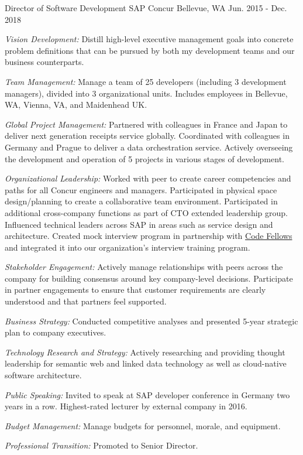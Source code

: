 \begin{cventries}

\cventry
{Director of Software Development} %
{SAP Concur} %
{Bellevue, WA} %
{Jun. 2015 - Dec. 2018} %
{ %
\begin{cvitems}
\item {\emph{Vision Development:} Distill high-level executive management goals into concrete problem definitions that can be pursued by both my development teams and our business counterparts.}
\item {\emph{Team Management:} Manage a team of 25 developers (including 3 development managers), divided into 3 organizational units. Includes employees in Bellevue, WA, Vienna, VA, and Maidenhead UK.}
\item {\emph{Global Project Management:} Partnered with colleagues in France and Japan to deliver next generation receipts service globally. Coordinated with colleagues in Germany and Prague to deliver a data orchestration service. Actively overseeing the development and operation of 5 projects in various stages of development.}
\item {\emph{Organizational Leadership:} Worked with peer to create career competencies and paths for all Concur engineers and managers. Participated in physical space design/planning to create a collaborative team environment. Participated in additional cross-company functions as part of CTO extended leadership group. Influenced technical leaders across SAP in areas such as service design and architecture. Created mock interview program in partnership with \href{https://www.codefellows.org/}{Code Fellows} and integrated it into our organization’s interview training program.}
\item {\emph{Stakeholder Engagement:} Actively manage relationships with peers across the company for building consensus around key company-level decisions. Participate in partner engagements to ensure that customer requirements are clearly understood and that partners feel supported.}
\item {\emph{Business Strategy:} Conducted competitive analyses and presented 5-year strategic plan to company executives.}
\item {\emph{Technology Research and Strategy:} Actively researching and providing thought leadership for semantic web and linked data technology as well as cloud-native software architecture. }
\item {\emph{Public Speaking:} Invited to speak at SAP developer conference in Germany two years in a row. Highest-rated lecturer by external company in 2016.}
\item {\emph{Budget Management:} Manage budgets for personnel, morale, and equipment.}
\item {\emph{Professional Transition:} Promoted to Senior Director.}
\end{cvitems}
}


\end{cventries}

